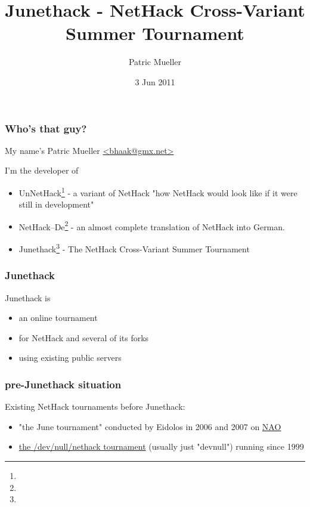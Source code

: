 \documentclass{beamer}
\title{Junethack - NetHack Cross-Variant Summer Tournament}
\author{Patric Mueller}
\date{3 Jun 2011}
\begin{document}
\begin{frame}
\titlepage
\end{frame}


\begin{frame}
\frametitle{Who's that guy?}
My name's Patric Mueller \href{mailto:bhaak@gmx.net}{<bhaak@gmx.net>} \pause

I'm the developer of \pause

  \begin{itemize}[<+->]
    \item UnNetHack\footnote{} - a variant of NetHack "how NetHack would look like if it were still in development"
    \item NetHack--De\footnote{} - an almost complete translation of NetHack into German.
    \item Junethack\footnote{} - The NetHack Cross-Variant Summer Tournament
  \end{itemize}
\end{frame}

\begin{frame}
\frametitle{Junethack}
Junethack is
  \begin{itemize}
    \item an online tournament
    \item for NetHack and several of its forks
    \item using existing public servers
  \end{itemize}
\end{frame}

\begin{frame}
\frametitle{pre-Junethack situation}
  Existing NetHack tournaments before Junethack:\pause
  \begin{itemize}[<+->]
    \item "the June tournament" conducted by Eidolos in 2006 and 2007 on \href{http://nethack.alt.org/}{NAO}
    \item \href{http://nethack.devnull.net/}{the /dev/null/nethack tournament} (usually just "devnull") running since 1999
  \end{itemize}
\end{frame}
\end{document}
